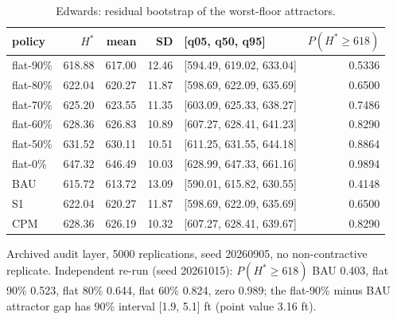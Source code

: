 \begin{table}[H]
\centering
\caption{Edwards: residual bootstrap of the worst-floor attractors.}
\label{tab:si-edw-boot}
\small
\begin{tabular}{lrrrlr}
\toprule
policy & $H^*$ & mean & SD & [q05, q50, q95] & $P(H^*\ge618)$ \\
\midrule
flat-90\% & 618.88 & 617.00 & 12.46 & [594.49, 619.02, 633.04] & 0.5336 \\
flat-80\% & 622.04 & 620.27 & 11.87 & [598.69, 622.09, 635.69] & 0.6500 \\
flat-70\% & 625.20 & 623.55 & 11.35 & [603.09, 625.33, 638.27] & 0.7486 \\
flat-60\% & 628.36 & 626.83 & 10.89 & [607.27, 628.41, 641.23] & 0.8290 \\
flat-50\% & 631.52 & 630.11 & 10.51 & [611.25, 631.55, 644.18] & 0.8864 \\
flat-0\% & 647.32 & 646.49 & 10.03 & [628.99, 647.33, 661.16] & 0.9894 \\
BAU & 615.72 & 613.72 & 13.09 & [590.01, 615.82, 630.55] & 0.4148 \\
S1 & 622.04 & 620.27 & 11.87 & [598.69, 622.09, 635.69] & 0.6500 \\
CPM & 628.36 & 626.19 & 10.32 & [607.27, 628.41, 639.67] & 0.8290 \\
\bottomrule
\end{tabular}
\par\smallskip\begin{minipage}{0.97\linewidth}\footnotesize Archived audit layer, 5000 replications, seed 20260905, no non-contractive replicate. Independent re-run (seed 20261015): $P(H^*\ge618)$ BAU 0.403, flat 90\% 0.523, flat 80\% 0.644, flat 60\% 0.824, zero 0.989; the flat-90\% minus BAU attractor gap has 90\% interval [1.9, 5.1] ft (point value 3.16 ft).\end{minipage}
\end{table}
